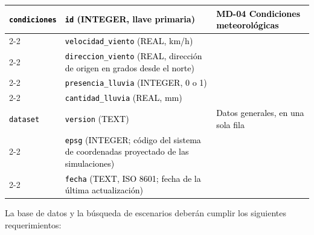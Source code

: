 \begin{longtable}{|p{\bdA}|p{\bdB}|p{\bdC}|}
  \textcolor{black}{\texttt{condiciones}} & \textcolor{black}{\texttt{id} (INTEGER, llave primaria)} & \textcolor{black}{MD-04 Condiciones meteorológicas}\tabularnewline\cline{2-2}
 & \textcolor{black}{\texttt{velocidad\_viento} (REAL, km/h)} & \tabularnewline\cline{2-2}
 & \textcolor{black}{\texttt{direccion\_viento} (REAL, dirección de origen en grados desde el norte)} & \tabularnewline\cline{2-2}
 & \textcolor{black}{\texttt{presencia\_lluvia} (INTEGER, 0 o 1)} & \tabularnewline\cline{2-2}
 & \textcolor{black}{\texttt{cantidad\_lluvia} (REAL, mm)} & \tabularnewline\hline
  \textcolor{black}{\texttt{\textcolor{black}{dataset}}} & \textcolor{black}{\texttt{version} (TEXT)} & \textcolor{black}{Datos generales, en una sola fila}\tabularnewline\cline{2-2}
 & \textcolor{black}{\texttt{epsg} (INTEGER; código del sistema de coordenadas proyectado de las simulaciones)} & \tabularnewline\cline{2-2}
 & \textcolor{black}{\texttt{fecha} (TEXT, ISO 8601; fecha de la última actualización)} & \tabularnewline\hline
\end{longtable}

La base de datos y la búsqueda de escenarios deberán cumplir los siguientes requerimientos:

